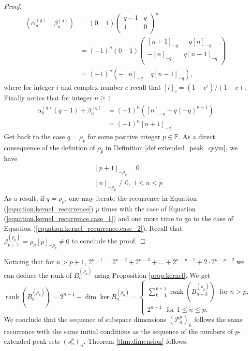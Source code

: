 \documentclass[submission]{FPSAC2023}
\newcommand{\PP}{\mathbb{P}} %
\newcommand{\rank}{\operatorname{rank}}
\begin{document}
\begin{proof}
\begin{align*}
\left(\alpha_{n}^{(q)}\;\;\;\; \beta_{n}^{(q)}\right) &= (0\;\;\;\; 1){\begin{pmatrix}
q-1&q\\
1&0\\
\end{pmatrix}}^n\\
&= (-1)^n(0\;\;\;\; 1){\begin{pmatrix}
[n+1]_{-q}&-q[n]_{-q}\\
-[n]_{-q}&q[n-1]_{-q}\\
\end{pmatrix}}\\
&=(-1)^n(-[n]_{-q}\;\;\;\; q[n-1]_{-q}),
\end{align*}
where for integer $i$ and complex number $c$ recall that $[i]_c = (1 - c^i)/(1-c)$. Finally notice that for integer $n \geq 1$
\begin{align*}
\alpha_{n}^{(q)} (q-1) + \beta_{n}^{(q)} &= (-1)^n\left([n]_{-q} - q(-q)^{n-1}\right)\\
&=(-1)^n[n+1]_{-q}.
\end{align*}
Get back to the case $q=\rho_p$ for some positive integer $p \in \PP$. As a direct consequence of the defintion of $\rho_p$ in Definition \ref{def.extended_peak_qsym}, we have
\begin{align*}
&[p+1]_{-\rho_p} = 0\\
&[n]_{-\rho_p} \neq 0,\; 1\leq n \leq p
\end{align*}
As a result, if $q=\rho_p$, one may iterate the recurrence in Equation (\ref{equation.kernel_recurrence}) $p$ times with the case of Equation (\ref{equation.kernel_recurrence.case_1}) and one more time to go to the case of Equation (\ref{equation.kernel_recurrence.case_2}). Recall that $\beta_{p+1}^{(\rho_p)} = \rho_p[p]_{-\rho_p} \neq 0$ to conclude the proof.
\end{proof}
%
Noticing that for $n > p+1$, $2^{n-1} = 2^{n-2} + 2^{n-3} + \dots + 2^{n-p-1} + 2\cdot 2^{n-p-2}$ we can deduce the rank of $B_n^{(\rho_p)}$ using Proposition \ref{prop.kernel}. We get
\begin{equation}
\rank \left (B_n^{(\rho_p)}\right) = 2^{n-1} - \dim \ker B_n^{(\rho_p)} = \begin{cases}\sum_{k =1}^{p+1} \rank\left(B_{n-k}^{(\rho_p)}\right)\;\mbox{ for } n > p,\\
2^{n-1}\;\mbox{ for } 1 \leq n \leq p.\end{cases}
\end{equation}
We conclude that the sequence of subspace dimensions $(\mathcal{P}^p_n)_n$ follows the same recurrence with the same initial conditions as the sequence of the numbers of $p$-extended peak sets $(s_n^p)_n$. Theorem \ref{thm.dimension} follows. 
\end{document}
